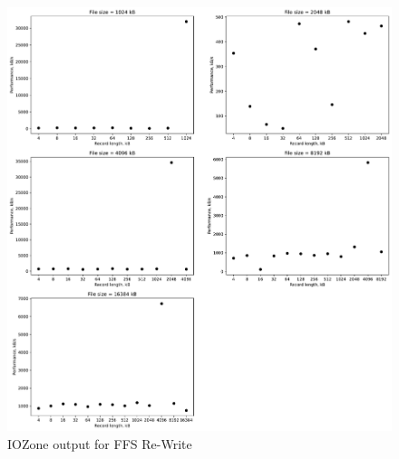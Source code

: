 \begin{figure}[!htb]
	\label{fig:app_bench_ffs_re_write}
	\begin{center}
		\includegraphics[width=1.0\textwidth]{figures/benchmarking/ffs/Re-Write.pdf}
	\end{center}
	\caption{IOZone output for FFS Re-Write}
\end{figure}

